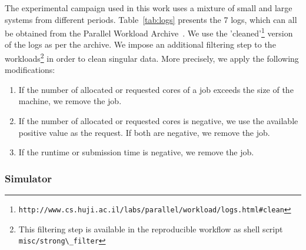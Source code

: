 \documentclass[sigconf,anonymous]{acmart}
\begin{document}
The experimental campaign used in this work uses a mixture of small and large
systems from different periods. Table~\ref{tab:logs} presents the 7 logs, which
can all be obtained from the Parallel Workload
Archive~\cite{Feitelson20142967}. We use the
'cleaned'\footnote{\lstinline[basicstyle=\ttfamily\color{blue}]|http://www.cs.huji.ac.il/labs/parallel/workload/logs.html#clean|}
version of the logs as per the archive. We impose an additional filtering step
to the workloads\footnote{This filtering step is available in the reproducible
workflow\cite{repro} as shell script
\lstinline[basicstyle=\ttfamily\color{blue}]|misc/strong\_filter|} in order to
clean singular data. More precisely, we apply the following modifications:

\begin{enumerate}

  \item If the number of allocated or requested cores of a job  exceeds the
    size of the machine, we remove the job.

  \item If the number of allocated or requested cores is negative, we use the
    available positive value as the request. If both are negative, we remove
    the job.

  \item If the runtime or submission time is negative, we remove the job.

\end{enumerate}

\subsubsection{Simulator}
\end{document}
